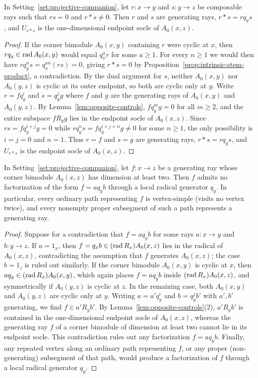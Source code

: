 \begin{corollary}
\label{cor:active-zero-pairs}
In Setting~\ref{set:projective-companion}, let $r\colon x\to y$ and $s\colon y\to z$ be composable rays such that $rs=0$ and $r*s\ne0$. Then $r$ and $s$ are generating rays, $r*s=rq_ys$, and $U_{r*s}$ is the one-dimensional endpoint socle of $A_0(x,z)$.
\end{corollary}
\begin{proof}
If the corner bimodule $A_0(x,y)$ containing $r$ were cyclic at $x$, then $rq_y\in\operatorname{rad} A_0(x,y)$ would equal $q_x^ar$ for some $a\geq1$. For every $n\geq1$ we would then have $rq_y^ns=q_x^{an}(rs)=0$, giving $r*s=0$ by Proposition~\ref{prop:intrinsic-stem-product}, a contradiction. By the dual argument for $s$, neither $A_0(x,y)$ nor $A_0(y,z)$ is cyclic at its outer endpoint, so both are cyclic only at $y$. Write $r=fq_y^i$ and $s=q_y^jg$ where $f$ and $g$ are the generating rays of $A_0(x,y)$ and $A_0(y,z)$. By Lemma~\ref{lem:opposite-controls}, $fq_y^mg=0$ for all $m\geq2$, and the entire subspace $fR_yg$ lies in the endpoint socle of $A_0(x,z)$. Since $rs=fq_y^{i+j}g=0$ while $rq_y^ns=fq_y^{i+j+n}g\ne0$ for some $n\geq1$, the only possibility is $i=j=0$ and $n=1$. Thus $r=f$ and $s=g$ are generating rays, $r*s=rq_ys$, and $U_{r*s}$ is the endpoint socle of $A_0(x,z)$.
\end{proof}

\begin{lemma}
\label{lem:generating-paths}
In Setting~\ref{set:projective-companion}, let $f\colon x\to z$ be a generating ray whose corner bimodule $A_0(x,z)$ has dimension at least two. Then $f$ admits no factorization of the form $f=aq_yb$ through a local radical generator $q_y$. In particular, every ordinary path representing $f$ is vertex-simple (visits no vertex twice), and every nonempty proper subsegment of such a path represents a generating ray.
\end{lemma}
\begin{proof}
Suppose for a contradiction that $f=aq_yb$ for some rays $a\colon x\to y$ and $b\colon y\to z$. If $a=1_x$, then $f=q_xb\in(\operatorname{rad} R_x)A_0(x,z)$ lies in the radical of $A_0(x,z)$, contradicting the assumption that $f$ generates $A_0(x,z)$; the case $b=1_z$ is ruled out similarly. If the corner bimodule $A_0(x,y)$ is cyclic at $x$, then $aq_y\in(\operatorname{rad} R_x)A_0(x,y)$, which again places $f=aq_yb$ inside $(\operatorname{rad} R_x)A_0(x,z)$, and symmetrically if $A_0(y,z)$ is cyclic at $z$. In the remaining case, both $A_0(x,y)$ and $A_0(y,z)$ are cyclic only at $y$. Writing $a=a'q_y^i$ and $b=q_y^jb'$ with $a',b'$ generating, we find $f\in a'R_yb'$. By Lemma~\ref{lem:opposite-controls}(2), $a'R_yb'$ is contained in the one-dimensional endpoint socle of $A_0(x,z)$, whereas the generating ray $f$ of a corner bimodule of dimension at least two cannot lie in its endpoint socle. This contradiction rules out any factorization $f=aq_yb$. Finally, any repeated vertex along an ordinary path representing $f$, or any proper (non-generating) subsegment of that path, would produce a factorization of $f$ through a local radical generator $q_y$.
\end{proof}

